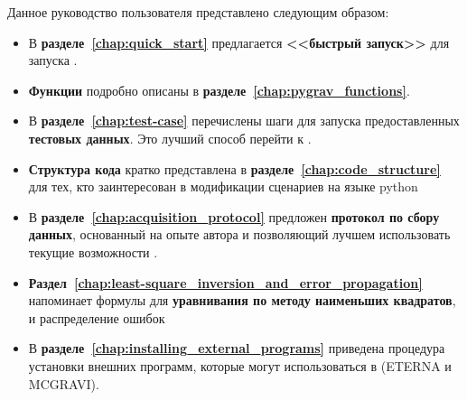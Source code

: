 Данное руководство пользователя представлено следующим образом:
\begin{itemize}
    \item В \textbf{разделе~\ref{chap:quick_start}} предлагается \textbf{<<быстрый
    запуск>>} для запуска \pg{}. 
    
    \item \textbf{Функции} \pg{} подробно описаны в
    \textbf{разделе~\ref{chap:pygrav_functions}}.
    
    \item В \textbf{разделе~\ref{chap:test-case}} перечислены шаги для запуска
    предоставленных \textbf{тестовых данных}. Это лучший способ перейти к \pg{}.
    
    \item \textbf{Структура кода} кратко представлена в
    \textbf{разделе~\ref{chap:code_structure}} для тех, кто заинтересован в
    модификации сценариев на языке python
    
    \item В \textbf{разделе~\ref{chap:acquisition_protocol}} предложен \textbf{протокол
    по сбору данных}, основанный на опыте автора и позволяющий лучшем
    использовать текущие возможности \pg{}.
    
    \item
    \textbf{Раздел~\ref{chap:least-square_inversion_and_error_propagation}}
    напоминает формулы для \textbf{уравнивания по методу наименьших квадратов}, и
    распределение ошибок
    
    \item В \textbf{разделе~\ref{chap:installing_external_programs}} приведена
    процедура установки внешних программ, которые могут использоваться в \pg{} 
    (ETERNA и MCGRAVI).

\end{itemize}